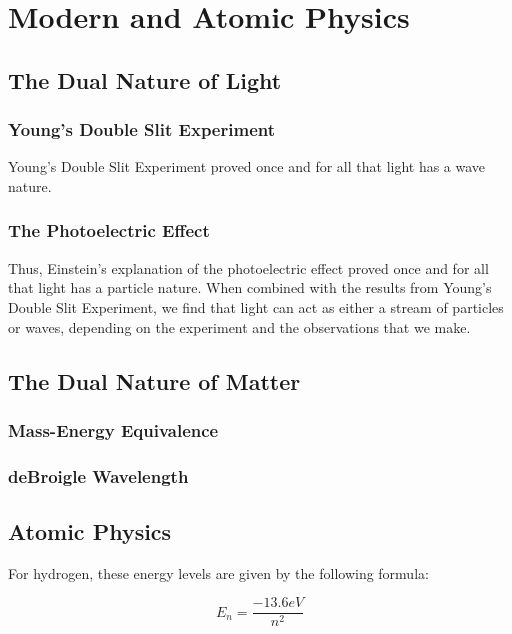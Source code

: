 \chapter{Modern and Atomic Physics}
\section{The Dual Nature of Light} 
\subsection{Young's Double Slit Experiment} 
Young's Double Slit Experiment proved once and for all that light has a wave nature.  
\subsection{The Photoelectric Effect} 
Thus, Einstein's explanation of the photoelectric effect proved once and for all that light has a particle nature.  When combined with the results from Young's Double Slit Experiment, we find that light can act as either a stream of particles or waves, depending on the experiment and the observations that we make.  


\section{The Dual Nature of Matter} 
\subsection{Mass-Energy Equivalence} 
\subsection{deBroigle Wavelength} 

\section{Atomic Physics} 


For hydrogen, these energy levels are given by the following formula:

\begin{mdframed}[backgroundcolor=orange!20!white]
	\begin{equation}
	E_n = \frac{-13.6 \si{eV}}{n^2}  
	\label{eqn:hydrogenenergy}
	\end{equation}
\end{mdframed}

